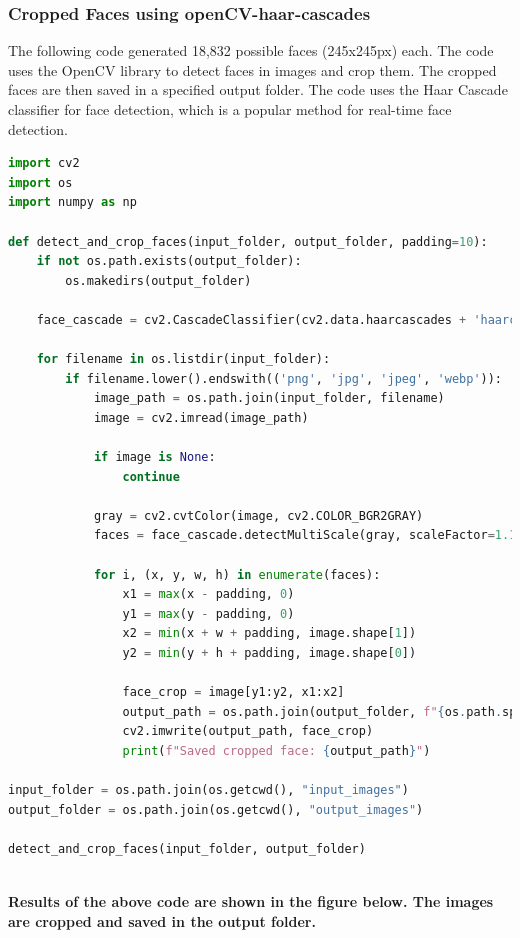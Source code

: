 \documentclass[openany]{report}
\begin{document}
\subsubsection{Cropped Faces using openCV-haar-cascades}
The following code generated 18,832 possible faces (245x245px) each. The code uses the OpenCV library to detect faces in images and crop them. The cropped faces are then saved in a specified output folder. The code uses the Haar Cascade classifier for face detection, which is a popular method for real-time face detection. 
\begin{lstlisting}[language=Python]
import cv2
import os
import numpy as np

def detect_and_crop_faces(input_folder, output_folder, padding=10):
    if not os.path.exists(output_folder):
        os.makedirs(output_folder)
    
    face_cascade = cv2.CascadeClassifier(cv2.data.haarcascades + 'haarcascade_frontalface_default.xml')
    
    for filename in os.listdir(input_folder):
        if filename.lower().endswith(('png', 'jpg', 'jpeg', 'webp')):
            image_path = os.path.join(input_folder, filename)
            image = cv2.imread(image_path)
            
            if image is None:
                continue
            
            gray = cv2.cvtColor(image, cv2.COLOR_BGR2GRAY)
            faces = face_cascade.detectMultiScale(gray, scaleFactor=1.1, minNeighbors=5, minSize=(30, 30))
            
            for i, (x, y, w, h) in enumerate(faces):
                x1 = max(x - padding, 0)
                y1 = max(y - padding, 0)
                x2 = min(x + w + padding, image.shape[1])
                y2 = min(y + h + padding, image.shape[0])
                
                face_crop = image[y1:y2, x1:x2]
                output_path = os.path.join(output_folder, f"{os.path.splitext(filename)[0]}_face_{i}.jpg")
                cv2.imwrite(output_path, face_crop)
                print(f"Saved cropped face: {output_path}")

input_folder = os.path.join(os.getcwd(), "input_images")  
output_folder = os.path.join(os.getcwd(), "output_images") 

detect_and_crop_faces(input_folder, output_folder)
    
\end{lstlisting}
\textbf{Results of the above code are shown in the figure below. The images are cropped and saved in the output folder.}
\end{document}
